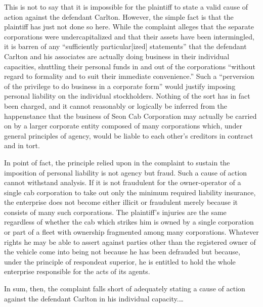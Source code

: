 This is not to say that it is impossible for the plaintiff to state a valid
cause of action against the defendant Carlton. However, the simple fact is that
the plaintiff has just not done so here. While the complaint alleges that the
separate corporations were undercapitalized and that their assets have been
intermingled, it is barren of any ``sufficiently particular[ized] statements''
that the defendant Carlton and his associates are actually doing business in
their individual capacities, shuttling their personal funds in and out of the
corporations ``without regard to formality and to suit their immediate
convenience.'' Such a ``perversion of the privilege to do business in a
corporate form'' would justify imposing personal liability on the individual
stockholders. Nothing of the sort has in fact been charged, and it cannot
reasonably or logically be inferred from the happenstance that the business of
Seon Cab Corporation may actually be carried on by a larger corporate entity
composed of many corporations which, under general principles of agency, would
be liable to each other's creditors in contract and in tort. 

In point of fact, the principle relied upon in the complaint to sustain the
imposition of personal liability is not agency but fraud. Such a cause of action
cannot withstand analysis. If it is not fraudulent for the owner-operator of a
single cab corporation to take out only the minimum required liability
insurance, the enterprise does not become either illicit or fraudulent merely
because it consists of many such corporations. The plaintiff's injuries are the
same regardless of whether the cab which strikes him is owned by a single
corporation or part of a fleet with ownership fragmented among many
corporations. Whatever rights he may be able to assert against parties other
than the registered owner of the vehicle come into being not because he has been
defrauded but because, under the principle of respondeat superior, he is
entitled to hold the whole enterprise responsible for the acts of its agents. 

In sum, then, the complaint falls short of adequately stating a cause of action
against the defendant Carlton in his individual capacity.\ldots 

